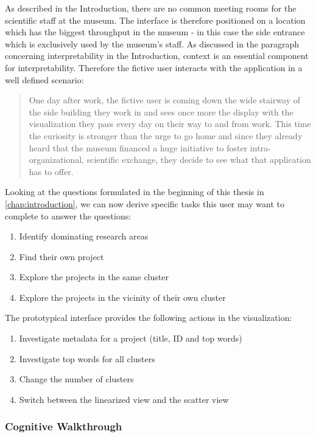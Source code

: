 As described in the Introduction, there are no common meeting rooms for the scientific staff at the museum. The interface is therefore positioned on a location which has the biggest throughput in the museum - in this case the side entrance which is exclusively used by the museum's staff.
As discussed in the paragraph concerning interpretability in the Introduction, context is an essential component for interpretability. Therefore the fictive user interacts with the application in a well defined scenario:

\begin{quote}
	One day after work, the fictive user is coming down the wide stairway of the side building they work in and sees once more the display with the visualization they pass every day on their way to and from work. This time the curiosity is stronger than the urge to go home and since they already heard that the museum financed a huge initiative to foster intra-organizational, scientific exchange, they decide to see what that application has to offer.
\end{quote}


Looking at the questions formulated in the beginning of this thesis in \autoref{chap:introduction}, we can now derive specific tasks this user may want to complete to answer the questions:
\begin{enumerate}
	\item Identify dominating research areas
	\item Find their own project
	\item Explore the projects in the same cluster
	\item Explore the projects in the vicinity of their own cluster
\end{enumerate}

The prototypical interface provides the following actions in the visualization:
\begin{enumerate}
	\item Investigate metadata for a project (title, ID and top words)
	\item Investigate top words for all clusters
	\item Change the number of clusters
	\item Switch between the linearized view and the scatter view
\end{enumerate}



\subsubsection{Cognitive Walkthrough} 

